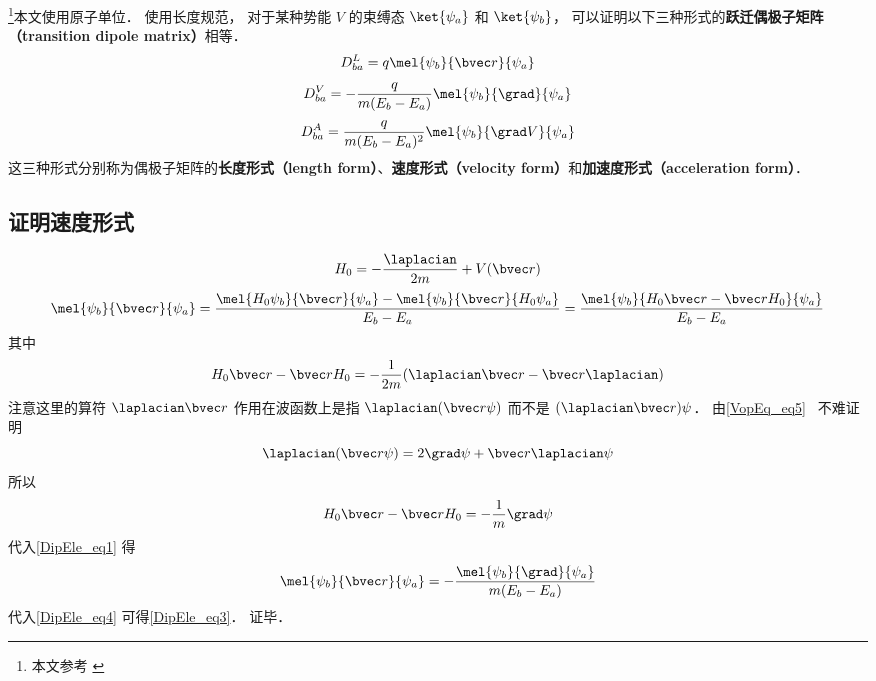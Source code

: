 

\footnote{本文参考 \cite{Brandsen}}本文使用原子单位． 使用长度规范， 对于某种势能 $V$ 的束缚态 $\ket{\psi_a}$ 和 $\ket{\psi_b}$， 可以证明以下三种形式的\textbf{跃迁偶极子矩阵（transition dipole matrix）}相等．
\begin{equation}\label{DipEle_eq4}
D_{ba}^L = q\mel{\psi_b}{\bvec r}{\psi_a}
\end{equation}
\begin{equation}\label{DipEle_eq3}
D_{ba}^V = -\frac{q}{m(E_b - E_a)}\mel{\psi_b}{\grad}{\psi_a}
\end{equation}
\begin{equation}
D_{ba}^A = \frac{q}{m(E_b-E_a)^2} \mel{\psi_b}{\grad V}{\psi_a}
\end{equation}
这三种形式分别称为偶极子矩阵的\textbf{长度形式（length form）}、\textbf{速度形式（velocity form）}和\textbf{加速度形式（acceleration form）}．

\subsection{证明速度形式}
\begin{equation}
H_0 = -\frac{\laplacian}{2m} + V(\bvec r)
\end{equation}
\begin{equation}\label{DipEle_eq1}
\mel{\psi_b}{\bvec r}{\psi_a} = \frac{\mel{H_0\psi_b}{\bvec r}{\psi_a} - \mel{\psi_b}{\bvec r}{H_0\psi_a}}{E_b - E_a} = \frac{\mel{\psi_b}{H_0\bvec r - \bvec rH_0}{\psi_a}}{E_b - E_a}
\end{equation}
其中
\begin{equation}
H_0\bvec r - \bvec rH_0 = -\frac{1}{2m}(\laplacian \bvec r - \bvec r \laplacian)
\end{equation}
注意这里的算符 $\laplacian \bvec r$ 作用在波函数上是指 $\laplacian (\bvec r \psi)$ 而不是 $(\laplacian \bvec r) \psi$． 由\autoref{VopEq_eq5}~ 不难证明
\begin{equation}
\laplacian (\bvec r \psi) = 2 \grad \psi + \bvec r \laplacian \psi
\end{equation}
所以
\begin{equation}
H_0\bvec r - \bvec rH_0 = -\frac{1}{m}\grad \psi
\end{equation}
代入\autoref{DipEle_eq1} 得
\begin{equation}
\mel{\psi_b}{\bvec r}{\psi_a} = -\frac{\mel{\psi_b}{\grad}{\psi_a}}{m(E_b - E_a)}
\end{equation}
代入\autoref{DipEle_eq4} 可得\autoref{DipEle_eq3}． 证毕．

